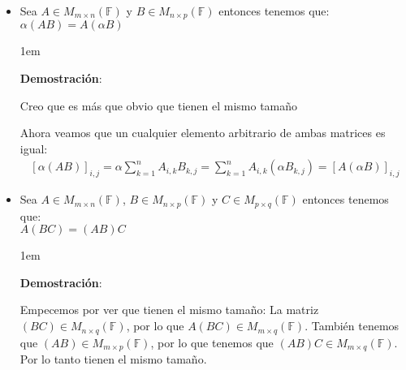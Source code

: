\documentclass[12pt]{report}                                    %
\newenvironment{SmallIndentation}[1][0.75em]                    %
    {\begin{adjustwidth}{#1}{}\begin{footnotesize}}                 %
    {\end{footnotesize}\end{adjustwidth}}                           %
\begin{document}
\begin{itemize}
\begin{SmallIndentation}[1em]
                        \end{SmallIndentation}

                    \item Sea $A \in M_{m \times n}(\mathbb{F})$ y $B \in M_{n \times p}(\mathbb{F})$
                        entonces tenemos que: $\alpha(AB) = A(\alpha B)$

                    \begin{SmallIndentation}[1em]
                        \textbf{Demostración}:

                        Creo que es más que obvio que tienen el mismo tamaño

                        Ahora veamos que un cualquier elemento arbitrario de ambas matrices es igual:
                        \begin{equation*}
                        \begin{split}
                            [\alpha(AB)]_{i, j}    
                                = \alpha \sum_{k=1}^{n} A_{i, k} B_{k, j}              
                                = \sum_{k=1}^{n} A_{i, k} (\alpha B_{k, j} )            
                                = [A(\alpha B)]_{i, j}
                        \end{split}
                        \end{equation*}

                    \end{SmallIndentation}

                    \item Sea $A \in M_{m \times n}(\mathbb{F})$, $B \in M_{n \times p}(\mathbb{F})$
                        y $C \in M_{p \times q}(\mathbb{F})$ entonces tenemos que:  \\
                        $A(BC) = (AB)C$

                        \begin{SmallIndentation}[1em]
                            \textbf{Demostración}:

                            Empecemos por ver que tienen el mismo tamaño:
                            La matriz $(BC) \in M_{n \times q}(\mathbb{F})$, por lo que 
                            $A(BC) \in M_{m \times q}(\mathbb{F})$.
                            También tenemos que $(AB) \in M_{m \times p}(\mathbb{F})$, por lo que tenemos
                            que $(AB)C \in M_{m \times q}(\mathbb{F})$.
                            Por lo tanto tienen el mismo tamaño.


\end{SmallIndentation}
\end{itemize}
\end{document}

